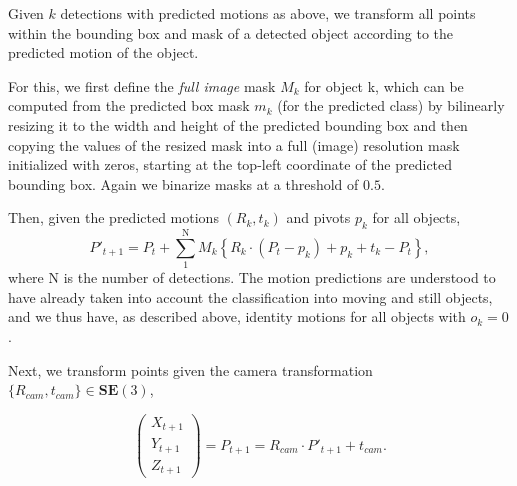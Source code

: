 Given $k$ detections with predicted motions as above, we transform all points within the bounding
box and mask of a detected object according to the predicted motion of the object.

For this, we first define the \emph{full image} mask $M_k$ for object k,
which can be computed from the predicted box mask $m_k$ (for the predicted class) by bilinearly resizing
it to the width and height of the predicted bounding box and then copying the values
of the resized mask into a full (image) resolution mask initialized with zeros,
starting at the top-left coordinate of the predicted bounding box.
Again we binarize masks at a threshold of $0.5$.

Then, given the predicted motions $(R_k, t_k)$ and pivots $p_k$ for all objects,
\begin{equation}
P'_{t+1} =
P_t + \sum_1^{\text{N}} M_k\left\{ R_k \cdot (P_t - p_k) + p_k + t_k - P_t \right\},
\end{equation}
where N is the number of detections.
The motion predictions are understood to have already taken into account
the classification into moving and still objects,
and we thus have, as described above, identity motions for all objects with $o_k = 0$.

Next, we transform points given the camera transformation $\{R_{cam}, t_{cam}\} \in \mathbf{SE}(3)$,

\begin{equation}
\begin{pmatrix}
X_{t+1} \\ Y_{t+1} \\ Z_{t+1}
\end{pmatrix}
= P_{t+1} = R_{cam} \cdot P'_{t+1} + t_{cam}.
\end{equation}


